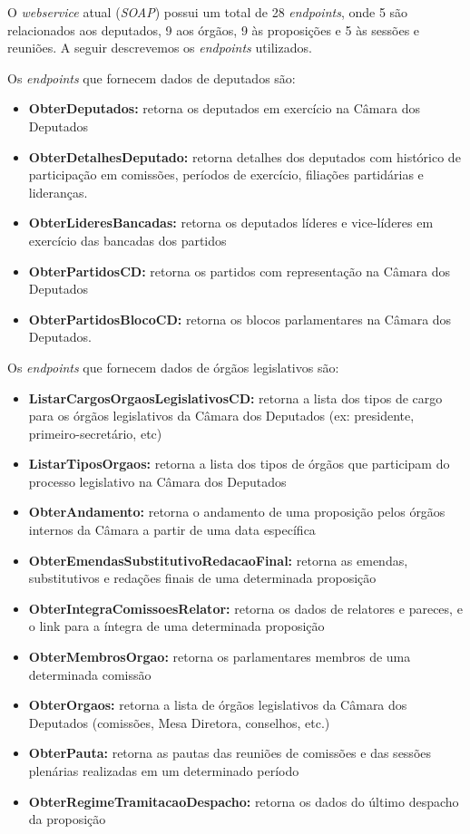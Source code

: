 \begin{apendicesenv}
O \textit{webservice} atual (\textit{SOAP}) possui um total de 28 \textit{endpoints}, onde 5 são relacionados aos deputados, 9 aos órgãos, 9 às proposições e 5 às sessões e reuniões. A seguir descrevemos os \textit{endpoints} utilizados.

Os \textit{endpoints} que fornecem dados de deputados são:
\begin{itemize}
    \item \textbf{ObterDeputados:} retorna os deputados em exercício na Câmara dos Deputados
    \item \textbf{ObterDetalhesDeputado:} retorna detalhes dos deputados com histórico de participação em comissões, períodos de exercício, filiações partidárias e lideranças.
    \item \textbf{ObterLideresBancadas:} retorna os deputados líderes e vice-líderes em exercício das bancadas dos partidos
    \item \textbf{ObterPartidosCD:} retorna os partidos com representação na Câmara dos Deputados
    \item \textbf{ObterPartidosBlocoCD:} retorna os blocos parlamentares na Câmara dos Deputados.
\end{itemize}

Os \textit{endpoints} que fornecem dados de órgãos legislativos são:

\begin{itemize}
    \item \textbf{ListarCargosOrgaosLegislativosCD:} retorna a lista dos tipos de cargo para os órgãos legislativos da Câmara dos Deputados (ex: presidente, primeiro-secretário, etc)
    \item \textbf{ListarTiposOrgaos:} retorna a lista dos tipos de órgãos que participam do processo legislativo na Câmara dos Deputados
    \item \textbf{ObterAndamento:} retorna o andamento de uma proposição pelos órgãos internos da Câmara a partir de uma data específica
    \item \textbf{ObterEmendasSubstitutivoRedacaoFinal:} retorna as emendas, substitutivos e redações finais de uma determinada proposição
    \item \textbf{ObterIntegraComissoesRelator:} retorna os dados de relatores e pareces, e o link para a íntegra de uma determinada proposição
    \item \textbf{ObterMembrosOrgao:} retorna os parlamentares membros de uma determinada comissão
    \item \textbf{ObterOrgaos:} retorna a lista de órgãos legislativos da Câmara dos Deputados (comissões, Mesa Diretora, conselhos, etc.)
    \item \textbf{ObterPauta:} retorna as pautas das reuniões de comissões e das sessões plenárias realizadas em um determinado período
    \item \textbf{ObterRegimeTramitacaoDespacho:} retorna os dados do último despacho da proposição
\end{itemize}


\end{apendicesenv}
